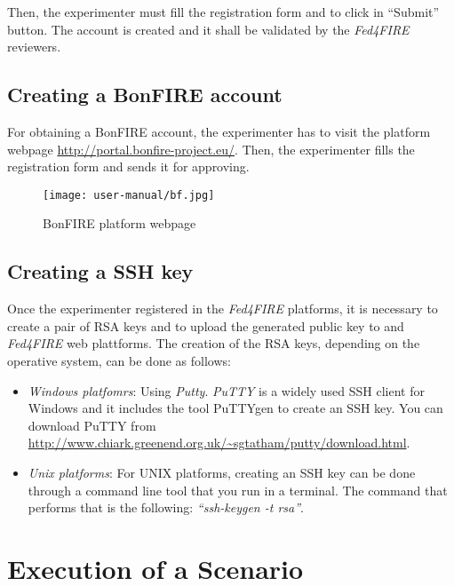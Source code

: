 Then, the experimenter must fill the registration form and to click in ``Submit''
button. The account is created and it shall be validated by the \emph{Fed4FIRE}
reviewers. 

\subsection{Creating a BonFIRE account}

For obtaining a BonFIRE account, the experimenter has to visit the platform webpage
\url{http://portal.bonfire-project.eu/}. Then, the experimenter fills the
registration form and sends it for approving. 

\begin{figure}[!h]
\begin{center}
\texttt{[image: user-manual/bf.jpg]}
\caption{BonFIRE platform webpage}
\label{fig:bonfire-account}
\end{center}
\end{figure}

\subsection{Creating a SSH key}

Once the experimenter registered in the \emph{Fed4FIRE} platforms, it is
necessary to create a pair of \ac{RSA} keys and to upload the generated public key to
\bonfire and \emph{Fed4FIRE} web plattforms. The creation of the \ac{RSA} keys,
depending on the operative system, can be done as follows:
\begin{itemize}
\item \emph{Windows platfomrs}: Using \emph{Putty}. \emph{PuTTY} is a widely
  used \ac{SSH} client for Windows and it includes the tool PuTTYgen to create
  an SSH key. You can download PuTTY from
  \url{http://www.chiark.greenend.org.uk/~sgtatham/putty/download.html}.

\item \emph{Unix platforms}: For UNIX platforms, creating an \ac{SSH} key can be
  done through a command line tool that you run in a terminal. The command that
  performs that is the following: \emph{``ssh-keygen -t rsa''}.

\end{itemize}


\section{Execution of a Scenario}

